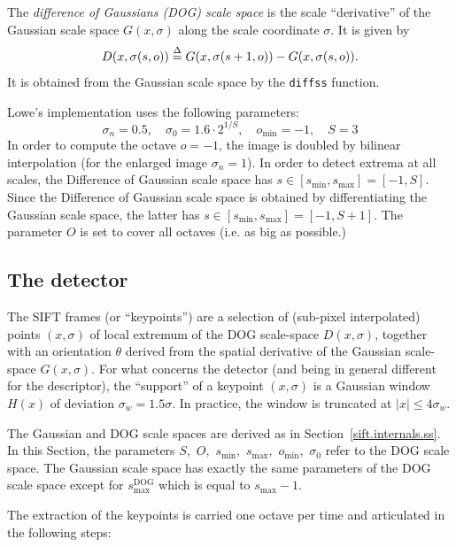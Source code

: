 \documentclass{article}
\let\oldtt=\tt
\renewcommand{\tt}{\oldtt\color{codecolor}}
\begin{document}
\medskip
{} The {\em difference of Gaussians (DOG) scale space} is the scale ``derivative'' of the Gaussian scale space $G(x,\sigma)$ along the scale coordinate $\sigma$. It is given by
\[
  D(x,\sigma(s,o)) \overset{\Delta}{=} G(x,\sigma(s+1,o)) - G(x,\sigma(s,o)).
\]
It is obtained from the Gaussian scale space by the {\tt diffss} function.

\begin{remark} Lowe's implementation uses the following parameters:
\[
\sigma_n = 0.5,
\quad
\sigma_0 = 1.6\cdot 2^{1/S},
\quad
o_{\min} = -1,
\quad
S =3
\]
In order to compute the octave $o=-1$, the image is doubled by bilinear interpolation (for the enlarged image $\sigma_n=1$). In order to detect extrema at all scales, the Difference of Gaussian scale space has $s\in[s_{\min},s_{\max}]=[-1,S]$. Since the Difference of Gaussian scale space is obtained by differentiating the Gaussian scale space, the latter has
$s\in[s_{\min},s_{\max}] = [-1,S+1]$. The parameter $O$ is set to cover all octaves (i.e. as big as possible.)
\end{remark}

\subsection{The detector}\label{sift.internals.detector}

The SIFT frames (or ``keypoints'') are a selection of (sub-pixel interpolated) points $(x,\sigma)$ of local extremum of the DOG scale-space $D(x,\sigma)$, together with an orientation $\theta$ derived from the spatial derivative of the Gaussian scale-space $G(x,\sigma)$. For what concerns the detector (and being in general different for the descriptor), the ``support'' of a keypoint $(x,\sigma)$ is a Gaussian window $H(x)$ of deviation $\sigma_w=1.5\sigma$. In practice, the window is truncated at $|x|\leq 4 \sigma_w$.

The Gaussian and DOG scale spaces are derived as in Section~\ref{sift.internals.ss}. In this Section, the parameters $S,$ $O,$ $s_{\min},$ $s_{\max},$ $o_{\min},$ $\sigma_0$ refer to the DOG scale space. The Gaussian scale space has exactly the same parameters of the DOG scale space except for $s_{\max}^{\text{DOG}}$ which is equal to $s_{\max} - 1$.

The extraction of the keypoints is carried one octave per time and articulated in the following steps:
\end{document}
